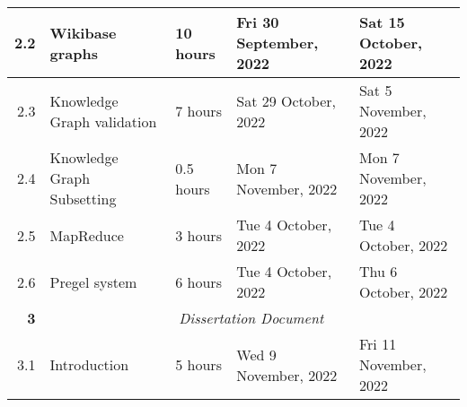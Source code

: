 \documentclass{standalone}
\begin{document}
\begin{tabular}{|r|llll|}
    2.2                                                           & \multicolumn{1}{l|}{Wikibase graphs}                            & \multicolumn{1}{l|}{10 hours}                                  & \multicolumn{1}{l|}{Fri 30 September, 2022}                 & Sat 15 October, 2022                                         \\ \hline
    2.3                                                           & \multicolumn{1}{l|}{Knowledge Graph validation}                 & \multicolumn{1}{l|}{7 hours}                                   & \multicolumn{1}{l|}{Sat 29 October, 2022}                   & Sat 5 November, 2022                                         \\ \hline
    2.4                                                           & \multicolumn{1}{l|}{Knowledge Graph Subsetting}                 & \multicolumn{1}{l|}{0.5 hours}                                 & \multicolumn{1}{l|}{Mon 7 November, 2022}                   & Mon 7 November, 2022                                         \\ \hline
    2.5                                                           & \multicolumn{1}{l|}{MapReduce}                                  & \multicolumn{1}{l|}{3 hours}                                   & \multicolumn{1}{l|}{Tue 4 October, 2022}                    & Tue 4 October, 2022                                          \\ \hline
    2.6                                                           & \multicolumn{1}{l|}{Pregel system}                              & \multicolumn{1}{l|}{6 hours}                                   & \multicolumn{1}{l|}{Tue 4 October, 2022}                    & Thu 6 October, 2022                                          \\ \hline
    \textbf{3}                                                    & \multicolumn{4}{c|}{\textit{Dissertation Document}}                                                                                                                                                                                                           \\ \hline
    3.1                                                           & \multicolumn{1}{l|}{Introduction}                               & \multicolumn{1}{l|}{5 hours}                                   & \multicolumn{1}{l|}{Wed 9 November, 2022}                   & Fri 11 November, 2022                                        \\ \hline

\end{tabular}
\end{document}
